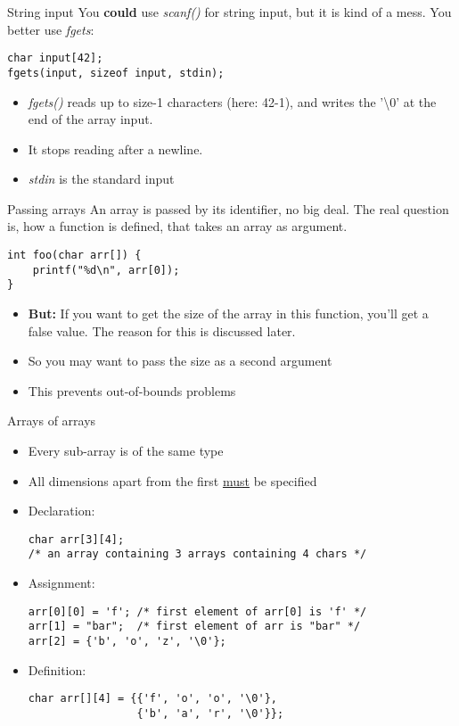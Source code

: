 \begin{frame}[fragile]{String input}
	You \textbf{could} use \textit{scanf()} for string input, but it is kind of a mess. You better use \textit{fgets}:
	\begin{lstlisting}[numbers=none]
char input[42];
fgets(input, sizeof input, stdin);
\end{lstlisting}
	\begin{itemize}
		\item \textit{fgets()} reads up to size-1 characters (here: 42-1), and writes the '\textbackslash0' at the end of the array input.
		\item It stops reading after a newline.
		\item \textit{stdin} is the standard input
	\end{itemize}
\end{frame}
\begin{frame}[fragile]{Passing arrays}
	An array is passed by its identifier, no big deal. The real question is, how a function is defined, that takes an array as argument.
	\begin{lstlisting}[numbers=none]
int foo(char arr[]) {
	printf("%d\n", arr[0]);
}
\end{lstlisting}
	\begin{itemize}
		\item \textbf{But:} If you want to get the size of the array in this function, you'll get a false value. The reason for this is discussed later.
		\item So you may want to pass the size as a second argument
		\item This prevents out-of-bounds problems
	\end{itemize}
\end{frame}
%
\begin{frame}[fragile]{Arrays of arrays}
	\begin{itemize}
		\item Every sub-array is of the same type
		\item All dimensions apart from the first \underline{must} be specified
		\item Declaration:
		\begin{lstlisting}[numbers=none]
char arr[3][4];
/* an array containing 3 arrays containing 4 chars */
\end{lstlisting}
		\item Assignment:
		\begin{lstlisting}[numbers=none]
arr[0][0] = 'f'; /* first element of arr[0] is 'f' */
arr[1] = "bar";  /* first element of arr is "bar" */
arr[2] = {'b', 'o', 'z', '\0'};
\end{lstlisting}
		\item Definition:
		\begin{lstlisting}[numbers=none]
char arr[][4] = {{'f', 'o', 'o', '\0'},
			     {'b', 'a', 'r', '\0'}};
\end{lstlisting}
	\end{itemize}
\end{frame}
